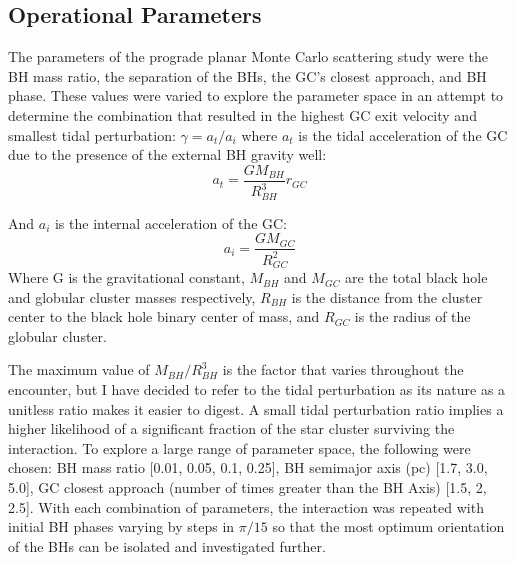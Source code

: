 \documentclass{aastex62}
\begin{document}
\subsection{Operational Parameters}
The parameters of the prograde planar Monte Carlo scattering study were the BH mass ratio, the separation of the BHs, the GC's closest approach, and BH phase. These values were varied to explore the parameter space in an attempt to determine the combination that resulted in the highest GC exit velocity and smallest tidal perturbation: $\gamma = {a_{t}}/{a_i}$ where $a_{t}$ is the tidal acceleration of the GC due to the presence of the external BH gravity well:
\begin{equation}
a_{t} = \frac{GM_{BH}}{R_{BH}^3}r_{GC}
\end{equation}

And $a_{i}$ is the internal acceleration of the GC:
\begin{equation}
a_{i} = \frac{GM_{GC}}{R_{GC}^2}
\end{equation}
Where G is the gravitational constant, $M_{BH}$ and $M_{GC}$ are the total black hole and globular cluster masses respectively, $R_{BH}$ is the distance from the cluster center to the black hole binary center of mass, and $R_{GC}$ is the radius of the globular cluster.

The maximum value of $M_{BH}/R_{BH}^3$ is the factor that varies throughout the encounter, but I have decided to refer to the tidal perturbation as its nature as a unitless ratio makes it easier to digest. A small tidal perturbation ratio implies a higher likelihood of a significant fraction of the star cluster surviving the interaction. To explore a large range of parameter space, the following were chosen: BH mass ratio [0.01, 0.05, 0.1, 0.25], BH semimajor axis (pc) [1.7, 3.0, 5.0], GC closest approach (number of times greater than the BH Axis) [1.5, 2, 2.5]. With each combination of parameters, the interaction was repeated with initial BH phases varying by steps in $\pi/15$ so that the most optimum orientation of the BHs can be isolated and investigated further. 
\end{document}
